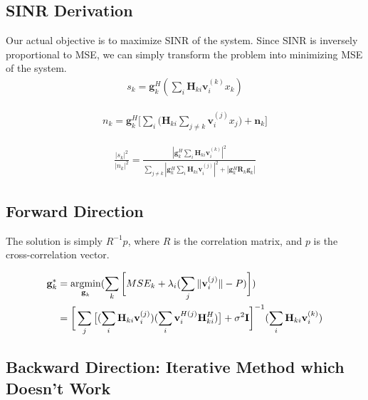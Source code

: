 \documentclass[11pt, oneside]{article}   	%
\begin{document}
\subsection{SINR Derivation}
Our actual objective is to maximize SINR of the system. Since SINR is inversely proportional to MSE, we can simply transform the problem into minimizing MSE of the system.
\begin{align*}
s_{k} = \textbf{g}^{H}_{k}
		(\displaystyle\sum_{i}
		\textbf{H}_{ki} 
		\textbf{v}^{(k)}_{i}x_k)
\end{align*}



\begin{align*}
n_{k} = \textbf{g}^{H}_{k}
		\bigg[\displaystyle\sum_{i}
		\big(	\textbf{H}_{ki} 
		\displaystyle\sum_{j \neq k}	\textbf{v}^{(j)}_{i}x_j	\big)
		+\textbf{n}_{k}\bigg]
\end{align*}

\begin{align*}
\frac	{	|s_{k}|^2	}{	|n_{k}|^2	} = 
\frac {	|\textbf{g}^{H}_{k}
		\displaystyle\sum_{i}
		\textbf{H}_{ki} 
		\textbf{v}^{(k)}_{i}|^2	
	} 
	{	\displaystyle\sum_{j \neq k}
		|\textbf{g}^{H}_{k}
		\displaystyle\sum_{i}
		\textbf{H}_{ki} 
		\textbf{v}^{(j)}_{i}|^2
		+|\textbf{g}^{H}_{k}
		\textbf{R}_{k}
		\textbf{g}_{k}|
	}
\end{align*}

\subsection{Forward Direction}
The solution is simply $R^{-1}p$, where $R$ is the correlation matrix,  and $p$ is the cross-correlation vector.


\begin{align*}
\textbf{g}^*_{k} 	&= \operatornamewithlimits{argmin}_{\textbf{g}_{k}}	(\displaystyle\sum_{k} 	\bigg[	MSE_{k}	+	\lambda_{i}	(\displaystyle\sum_{j}	\|	\textbf{v}^{(j)}_{i}	\|	-P	)	\bigg])	\\
			&= \bigg[	\displaystyle\sum_{j}
				\big[	(\displaystyle\sum_{i}\textbf{H}_{ki}\textbf{v}^{(j)}_{i})
			      (\displaystyle\sum_{i}\textbf{v}^{H(j)}_{i}\textbf{H}^{H}_{ki})	\big]	 +\sigma^2	\textbf{I}
			      \bigg]^{-1}	(\displaystyle\sum_{i}	\textbf{H}_{ki}	\textbf{v}^{(k)}_{i})		      
\end{align*}


\subsection{Backward Direction: Iterative Method which Doesn't Work}
\end{document}
